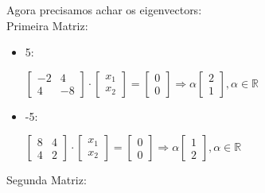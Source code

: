 \documentclass[12pt]{article}
\newcommand{\real}{\mathbb{R}}
\begin{document}
Agora precisamos achar os eigenvectors:\\
Primeira Matriz:
\begin{itemize}
\item 5:
  \begin{center}
    $\begin{bmatrix}
      -2 & 4 \\
      4 & -8
    \end{bmatrix}\cdot
    \begin{bmatrix}
      x_1 \\ x_2
    \end{bmatrix}=
    \begin{bmatrix}
      0 \\ 0
    \end{bmatrix}\Rightarrow \alpha
    \begin{bmatrix}
      2 \\ 1
    \end{bmatrix}, \alpha \in \real
    $
  \end{center}
\item -5:
  \begin{center}
    $
    \begin{bmatrix}
      8 & 4 \\
      4 & 2
    \end{bmatrix}\cdot
    \begin{bmatrix}
      x_1 \\ x_2
    \end{bmatrix}=
    \begin{bmatrix}
      0 \\ 0
    \end{bmatrix}\Rightarrow \alpha
    \begin{bmatrix}
      1 \\ 2
    \end{bmatrix}, \alpha \in \real
    $
  \end{center}
\end{itemize}
Segunda Matriz:
\end{document}
